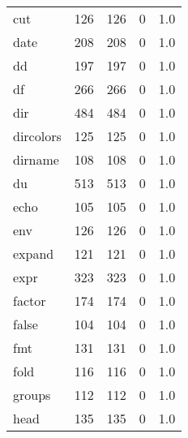 \begin{tabular}{lrrrr}
cut       &                     126 &              126 &                 0 &                          1.0 \\
date      &                     208 &              208 &                 0 &                          1.0 \\
dd        &                     197 &              197 &                 0 &                          1.0 \\
df        &                     266 &              266 &                 0 &                          1.0 \\
dir       &                     484 &              484 &                 0 &                          1.0 \\
dircolors &                     125 &              125 &                 0 &                          1.0 \\
dirname   &                     108 &              108 &                 0 &                          1.0 \\
du        &                     513 &              513 &                 0 &                          1.0 \\
echo      &                     105 &              105 &                 0 &                          1.0 \\
env       &                     126 &              126 &                 0 &                          1.0 \\
expand    &                     121 &              121 &                 0 &                          1.0 \\
expr      &                     323 &              323 &                 0 &                          1.0 \\
factor    &                     174 &              174 &                 0 &                          1.0 \\
false     &                     104 &              104 &                 0 &                          1.0 \\
fmt       &                     131 &              131 &                 0 &                          1.0 \\
fold      &                     116 &              116 &                 0 &                          1.0 \\
groups    &                     112 &              112 &                 0 &                          1.0 \\
head      &                     135 &              135 &                 0 &                          1.0 \\

\end{tabular}

